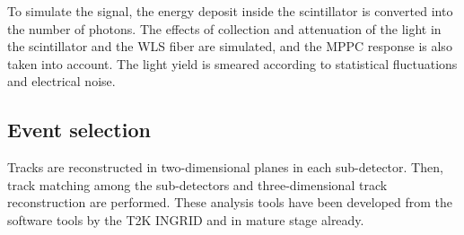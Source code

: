 

To simulate the signal, the energy deposit inside the scintillator is converted into the number of photons. 
The effects of collection and attenuation of the light in the scintillator and the WLS fiber are simulated, and the MPPC response is also taken into account. 
The light yield is smeared according to statistical fluctuations and electrical noise.


\subsection{Event selection}

Tracks are reconstructed in two-dimensional planes in each sub-detector.
Then, track matching among the sub-detectors and three-dimensional track reconstruction are performed.
These analysis tools have been developed from the software tools by the T2K INGRID and in mature stage already.

